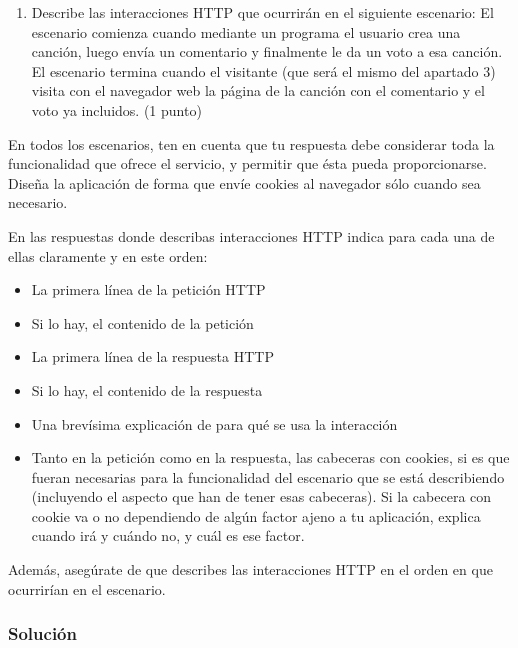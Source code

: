 \begin{enumerate}
  \item Describe las interacciones HTTP que ocurrirán en el siguiente escenario: El escenario comienza cuando mediante un programa el usuario crea una canción, luego envía un comentario y finalmente le da un voto a esa canción. El escenario termina cuando el visitante (que será el mismo del apartado 3) visita con el navegador web la página de la canción con el comentario y el voto ya incluidos. (1 punto)

\end{enumerate}

En todos los escenarios, ten en cuenta que tu respuesta debe considerar toda la funcionalidad que ofrece el servicio, y permitir que ésta pueda proporcionarse. Diseña la aplicación de forma que envíe cookies al navegador sólo cuando sea necesario.

En las respuestas donde describas interacciones HTTP indica para cada una de ellas claramente y en este orden:
  \begin{itemize}
  \item La primera línea de la petición HTTP
  \item Si lo hay, el contenido de la petición
  \item La primera línea de la respuesta HTTP
  \item Si lo hay, el contenido de la respuesta
  \item Una brevísima explicación de para qué se usa la interacción
  \item Tanto en la petición como en la respuesta, las cabeceras con cookies, si es que fueran necesarias para la funcionalidad del escenario que se está describiendo (incluyendo el aspecto que han de tener esas cabeceras). Si la cabecera con cookie va o no dependiendo de algún factor ajeno a tu aplicación, explica cuando irá y cuándo no, y cuál es ese factor.
  \end{itemize}

Además, asegúrate de que describes las interacciones HTTP en el orden en que ocurrirían en el escenario.


\subsubsection{Solución}

